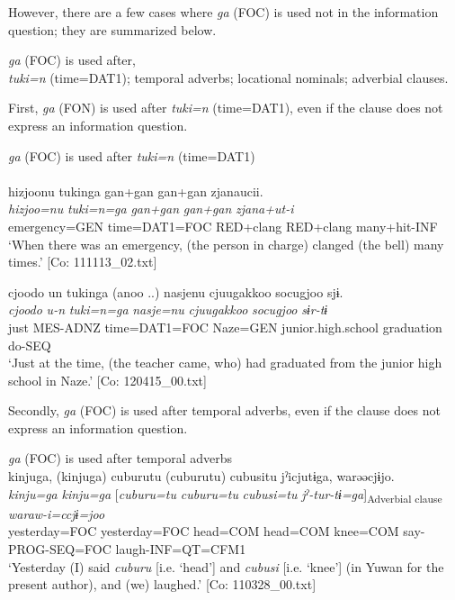   However, there are a few cases where \textit{ga} (FOC) is used not in the information question; they are summarized below.

\ea\label{ex:10.12}\textit{ga} (FOC) is used after,\\
  \ea \textit{tuki=n} (time=DAT1);
  \ex temporal adverbs;
  \ex locational nominals;
  \ex adverbial clauses.
  \z
\z

First, \textit{ga} (FON) is used after \textit{tuki=n} (time=DAT1), even if the clause does not express an information question.

\ea\label{ex:10.13}   \textit{ga} (FOC) is used after \textit{tuki=n} (time=DAT1)\\
  \ea\relax  [= (4-25 c)]\\
      \glll    {\textbar}hizjoo{\textbar}nu  tukinga  gan+gan  gan+gan                  zjanaucii.\\
      \textit{hizjoo=nu}  \textit{tuki=n=ga}  \textit{gan+gan}  \textit{gan+gan}        \textit{zjana+ut-i}\\
      emergency=GEN  time=DAT1=FOC  RED+clang  RED+clang                                many+hit-INF\\
      \glt       ‘When there was an emergency, (the person in charge) clanged (the bell) many times.’ [Co: 111113\_02.txt]

  \ex  %
      \glll    {\textbar}cjoodo{\textbar}  un  tukinga  (anoo ..)  nasjenu    cjuugakkoo  {\textbar}socugjoo{\textbar}  sjɨ.\\
      \textit{cjoodo}  \textit{u-n}  \textit{tuki=n=ga}    \textit{nasje=nu}    \textit{cjuugakkoo}  \textit{socugjoo}  \textit{sɨr-tɨ}\\
      just  MES-ADNZ  time=DAT1=FOC    Naze=GEN     junior.high.school  graduation  do-SEQ  \\
      \glt       ‘Just at the time, (the teacher came, who) had graduated from the junior high school in Naze.’ [Co: 120415\_00.txt]
    \z
\z

  Secondly, \textit{ga} (FOC) is used after temporal adverbs, even if the clause does not express an information question.

\ea\label{ex:10.14}   \textit{ga} (FOC) is used after temporal adverbs\\
  \ea  %
      \glll    kinjuga,  (kinjuga)  cuburutu  (cuburutu)  cubusitu     jˀicjutɨga,  warəəcjɨjo.\\
      \textit{kinju=ga}  \textit{kinju=ga}  [\textit{cuburu=tu}  \textit{cuburu=tu}  \textit{cubusi=tu}   \textit{jˀ-tur-tɨ=ga}]\textsubscript{Adverbial clause} \textit{waraw-i=ccjɨ=joo}\\
      yesterday=FOC  yesterday=FOC  head=COM  head=COM  knee=COM say-PROG-SEQ=FOC  laugh-INF=QT=CFM1\\
      \glt       ‘Yesterday (I) said \textit{cuburu} [i.e. ‘head’] and \textit{cubusi} [i.e. ‘knee’] (in Yuwan for the present author), and (we) laughed.’ [Co: 110328\_00.txt]


